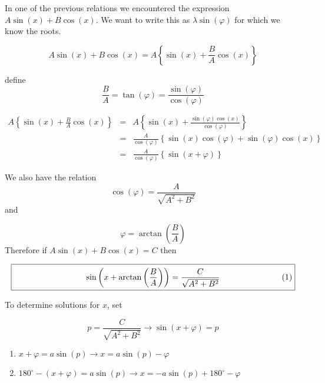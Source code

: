 \documentclass[11pt,a4paper]{article}
\newcommand{\sinb}[1]{\sin \left( #1 \right)}
\newcommand{\cosb}[1]{\cos \left( #1 \right)}
\newcommand{\boxedeqn}[1]{%
  \[\fbox{%
      \addtolength{\linewidth}{-2\fboxsep}%
      \addtolength{\linewidth}{-2\fboxrule}%
      \begin{minipage}{\linewidth}%
      \begin{equation}#1\end{equation}%
      \end{minipage}%
    }\]%
}
\begin{document}
In one of the previous relations we encountered the expression
$A\sinb{x}+B\cosb{x}$. We want to write this as $\lambda\sinb{\varphi}$ 
for which we know the roots.

\[A\sinb{x} + B\cosb{x} = A\left\{\sinb{x}+\frac{B}{A}\cosb{x}\right\}\]

define \[\frac{B}{A}=\tan({\varphi})=\frac{\sinb{\varphi}}{\cosb{\varphi}}\]


\begin{eqnarray}
A\left\{\sinb{x}+\frac{B}{A}\cosb{x}\right\} &=& A\left\{\sinb{x}+\frac{\sinb{\varphi}\cosb{x}}{\cosb{\varphi}}\right\} \nonumber\\
&=&\frac{A}{\cosb{\varphi}}\left\{\sinb{x}\cosb{\varphi}+\sinb{\varphi}\cosb{x}\right\} \nonumber\\
&=&\frac{A}{\cosb{\varphi}}\left\{\sinb{x+\varphi}\right\} \nonumber
\end{eqnarray}

We also have the relation
\[\cosb{\varphi}=\frac{A}{\sqrt{A^2+B^2}}\]
and

\[\varphi=\arctan\left({\frac{B}{A}}\right)\]
Therefore if $A\sinb{x}+B\cosb{x}=C$ then

\boxedeqn{
\sinb{x+\arctan\left({\frac{B}{A}}\right)}=\frac{C}{\sqrt{A^2+B^2}}
}
To determine solutions for $x$, set

\begin{displaymath}
p=\frac{C}{\sqrt{A^2+B^2}}\rightarrow \sinb{x+\varphi}=p
\end{displaymath}


\begin{enumerate}
\item $x+\varphi=a\sinb{p}\rightarrow x=a\sinb{p}-\varphi$
\item $180^\circ-\left(x+\varphi\right)=a\sinb{p}\rightarrow x=-a\sinb{p}+180^\circ-\varphi$
\end{enumerate}
\end{document}
